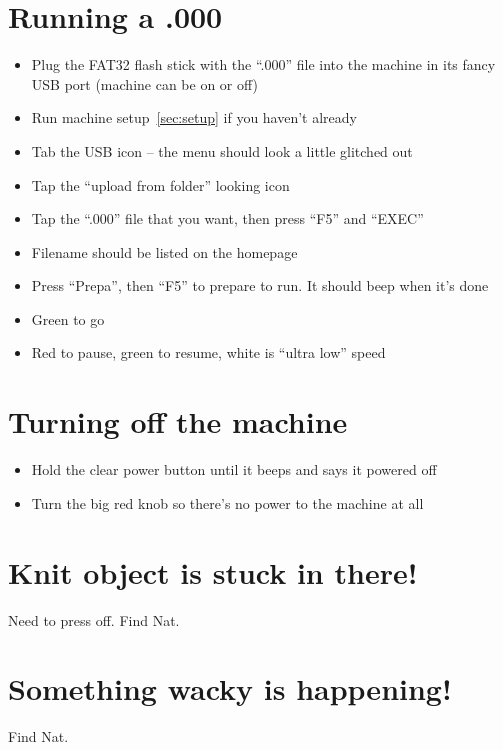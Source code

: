 \documentclass[acmsmall,screen,review,anonymous,nonacm]{acmart}
\begin{document}
\section{Running a .000}

\begin{itemize}
    \item Plug the FAT32 flash stick with the ``.000'' file into the machine in its fancy USB port (machine can be on or off)
    \item Run machine setup~\ref{sec:setup} if you haven't already
    \item Tab the USB icon -- the menu should look a little glitched out
    \item Tap the ``upload from folder'' looking icon
    \item Tap the ``.000'' file that you want, then press ``F5'' and ``EXEC''
    \item Filename should be listed on the homepage
    \item Press ``Prepa'', then ``F5'' to prepare to run. It should beep when it's done
    \item Green to go
    \item Red to pause, green to resume, white is ``ultra low'' speed
\end{itemize}

\section{Turning off the machine}

\begin{itemize}
    \item Hold the clear power button until it beeps and says it powered off
    \item Turn the big red knob so there's no power to the machine at all
\end{itemize}

\section{Knit object is stuck in there!}

Need to press off. Find Nat.

\section{Something wacky is happening!}

Find Nat.



\end{document}
